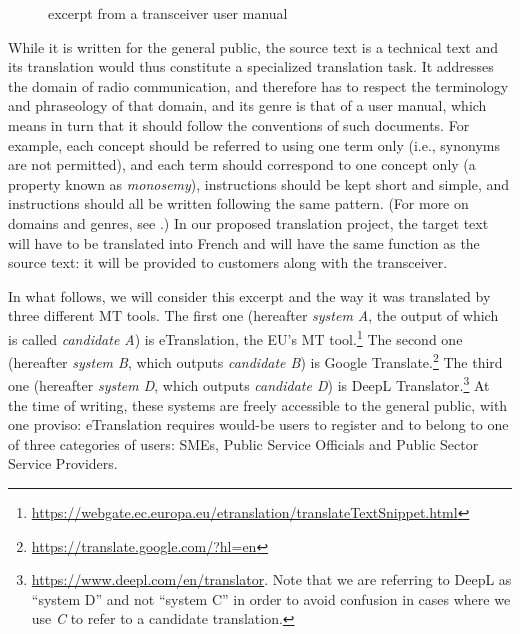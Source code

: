 \documentclass[output=paper]{langscibook}
\begin{document}
\begin{figure}
\caption{excerpt from a transceiver user manual}
\label{fig:rossi:3}
\end{figure}

While it is written for the general public, the source text is a technical text and its translation would thus constitute a specialized translation task. It addresses the domain of radio communication, and therefore has to respect the terminology and phraseology of that domain, and its genre is that of a user manual, which means in turn that it should follow the conventions of such documents. For example, each concept should be referred to using one term only (i.e., synonyms are not permitted), and each term should correspond to one concept only (a property known as \textit{monosemy}), instructions should be kept short and simple, and instructions should all be written following the same pattern. (For more on domains and genres, see .) In our proposed translation project, the target text will have to be translated into French and will have the same function as the source text: it will be provided to customers along with the transceiver. 

In what follows, we will consider this excerpt and the way it was translated by three different MT tools. The first one (hereafter \textit{system A}, the output of which is called \textit{candidate A}) is eTranslation, the EU’s MT tool.\footnote{{} \url{https://webgate.ec.europa.eu/etranslation/translateTextSnippet.html}} The second one (hereafter \textit{system B}, which outputs \textit{candidate B}) is Google Translate.\footnote{\url{https://translate.google.com/?hl=en}} The third one (hereafter \textit{system D}, which outputs \textit{candidate D}) is DeepL Translator.\footnote{\url{https://www.deepl.com/en/translator}{. Note that we are referring to DeepL as “system D” and not “system C” in order to avoid confusion in cases where we use \textit{C} to refer to a candidate translation.}} At the time of writing, these systems are freely accessible to the general public, with one proviso: eTranslation requires would-be users to register and to belong to one of three categories of users: SMEs, Public Service Officials and Public Sector Service Providers.
\end{document}
